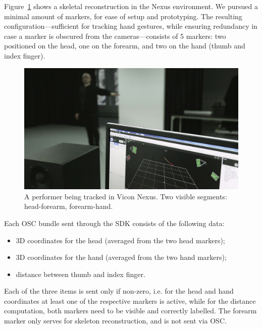 Figure~\ref{fig:nexus} shows a skeletal reconstruction in the Nexus environment. We pursued a minimal amount of markers, for ease of setup and prototyping. The resulting configuration---sufficient for tracking hand gestures, while ensuring redundancy in case a marker is obscured from the cameras---consists of 5 markers: two positioned on the head, one on the forearm, and two on the hand (thumb and index finger).

\begin{figure}[ht]
	\centering
	\includegraphics[width=\columnwidth, clip, trim={12cm 0 0 0}]{img/nexus}
	\caption{A performer being tracked in Vicon Nexus. Two visible segments: head-forearm, forearm-hand.}
	\label{fig:nexus}
\end{figure}

Each OSC bundle sent through the SDK consists of the following data:
\begin{itemize}
	\item 3D coordinates for the head (averaged from the two head markers);
	\item 3D coordinates for the hand (averaged from the two hand markers);
	\item distance between thumb and index finger.
\end{itemize}

Each of the three items is sent only if non-zero, i.e. for the head and hand coordinates at least one of the respective markers is active, while for the distance computation, both markers need to be visible and correctly labelled. The forearm marker only serves for skeleton reconstruction, and is not sent via OSC.


